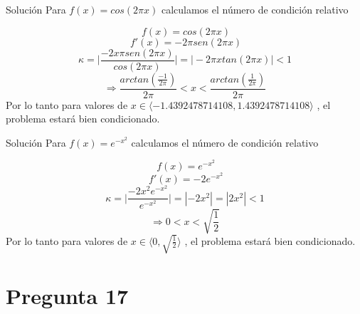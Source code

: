 \documentclass[10pts]{beamer}
\begin{document}
\newpage
\begin{frame}{Solución}
\vspace*{\fill}
Para $f(x)=cos(2{\pi}x)$ calculamos el número de condición relativo 

    \[ \ f(x)=cos(2{\pi}x)\]
    \[ \ f'(x)= -2{\pi}sen(2{\pi}x) \]
    \[\kappa = \bigg | \frac{-2x{\pi}sen(2{\pi}x)}{cos(2{\pi}x)} \bigg|  = \bigg | -2{\pi}xtan(2{\pi}x) \bigg| < 1\]
    \[ \Rightarrow \frac{arctan(\frac{-1}{2\pi})}{2\pi}<x<\frac{arctan(\frac{1}{2\pi})}{2\pi}\]
    Por lo tanto para valores de  $x \in \langle -1.4392478714108,1.4392478714108\rangle$ , el problema estará bien condicionado.
\vspace*{\fill}
\end{frame}
\newpage
\begin{frame}{Solución}
Para $f(x) = e^{-x^2}$ calculamos el número de condición relativo 

    \[ \ f(x)=e^{-x^2}\]
    \[ \ f'(x)= -2e^{-x^2} \]
    \[\kappa = \bigg | \frac{-2x^2e^{-x^2}}{e^{-x^2}} \bigg|  = |-2x^2| = |2x^2| < 1\]
    \[\Rightarrow 0<x<\sqrt{\frac{1}{2}}\]
    Por lo tanto para valores de  $x \in \langle 0,\sqrt{\frac{1}{2}}\rangle$ , el problema estará bien condicionado.
\vspace*{\fill}
\end{frame}

\section{Pregunta 17}
\end{document}
